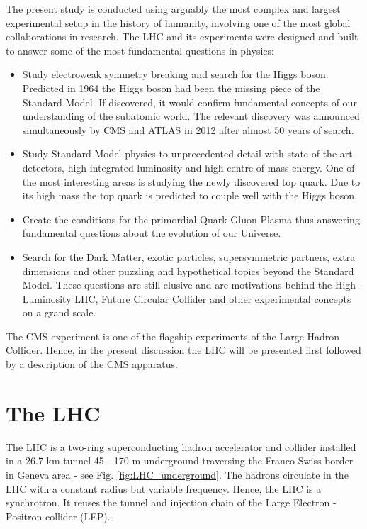 The present study is conducted using arguably the most complex and largest experimental setup in the history of humanity, involving one of the most global collaborations in research. The LHC and its experiments were designed and built to answer some of the most fundamental questions in physics:

\begin{itemize}
\item Study electroweak symmetry breaking and search for the Higgs boson. Predicted in 1964 \cite{Higgs:1964ia} \cite{Englert:1964et} the Higgs boson had been the missing piece of the Standard Model. If discovered, it would confirm fundamental concepts of our understanding of the subatomic world. The relevant discovery was announced simultaneously by CMS and ATLAS in 2012 \cite{Chatrchyan:2012xdj} \cite{Aad:2012tfa} after almost 50 years of search.
\item Study Standard Model physics to unprecedented detail with state-of-the-art detectors, high integrated luminosity and high centre-of-mass energy. One of the most interesting areas is studying the newly discovered top quark. Due to its high mass the top quark is predicted to couple well with the Higgs boson.
\item Create the conditions for the primordial Quark-Gluon Plasma thus answering fundamental questions about the evolution of our Universe.
\item Search for the Dark Matter, exotic particles, supersymmetric partners, extra dimensions and other puzzling and hypothetical topics beyond the Standard Model. These questions are still elusive and are motivations behind the High-Luminosity LHC, Future Circular Collider and other experimental concepts on a grand scale.
\end {itemize}

The CMS experiment is one of the flagship experiments of the Large Hadron Collider. Hence, in the present discussion the LHC will be presented first followed by a description of the CMS apparatus.

\section{The LHC}

The LHC is a two-ring superconducting hadron accelerator and collider installed in a 26.7 km tunnel 45 - 170 m underground traversing the Franco-Swiss border in Geneva area - see Fig. \ref{fig:LHC_underground}. The hadrons circulate in the LHC with a constant radius but variable frequency. Hence, the LHC is a synchrotron. It reuses the tunnel and injection chain of the Large Electron - Positron collider (LEP).

